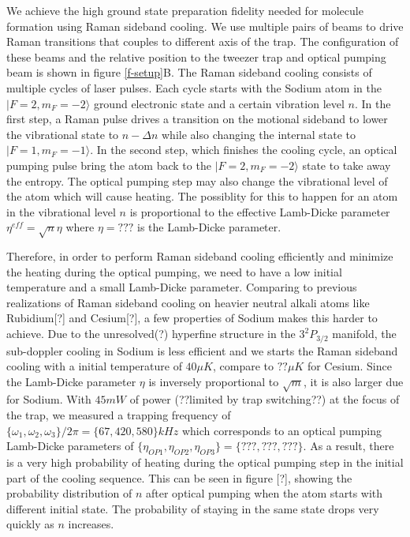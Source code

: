\documentclass[aps,twocolumn,secnumarabic,balancelastpage,amsmath,amssymb,nofootinbib]{revtex4}
\begin{document}
We achieve the high ground state preparation fidelity needed for molecule formation
using Raman sideband cooling. We use multiple pairs of beams to drive Raman transitions that
couples to different axis of the trap. The configuration of these beams and the relative position
to the tweezer trap and optical pumping beam is shown in figure \ref{f-setup}B.
The Raman sideband cooling consists of multiple cycles of laser pulses.
Each cycle starts with the Sodium atom in the $|F=2, m_F=-2\rangle$
ground electronic state and a certain vibration level $n$.
In the first step, a Raman pulse drives a transition on the motional sideband to lower
the vibrational state to $n-\Delta n$ while also changing the internal state
to $|F=1, m_F=-1\rangle$. In the second step, which finishes the cooling cycle,
an optical pumping pulse bring the atom back to the $|F=2, m_F=-2\rangle$ state to take away
the entropy. The optical pumping step may also change the vibrational level of the atom which
will cause heating. The possiblity for this to happen for an atom in the vibrational level $n$
is proportional to the effective Lamb-Dicke parameter $\eta^{eff}=\sqrt{n}\eta$ where $\eta=???$ is the Lamb-Dicke parameter.

Therefore, in order to perform Raman sideband cooling efficiently and minimize the heating during the optical pumping, we need to have a low initial temperature and a small Lamb-Dicke parameter. Comparing to previous realizations of Raman sideband cooling on heavier neutral alkali atoms like Rubidium[?] and Cesium[?], a few properties of Sodium makes this harder to achieve. Due to the unresolved(?) hyperfine structure in the $3^2P_{3/2}$ manifold, the sub-doppler cooling in Sodium is less efficient and we starts the Raman sideband cooling with a initial temperature of $40\mu K$, compare to $??\mu K$ for Cesium. Since the Lamb-Dicke parameter $\eta$ is inversely proportional to $\sqrt{m}$, it is also larger due for Sodium. With $45mW$ of power (??limited by trap switching??) at the focus of the trap, we measured a trapping frequency of $\{\omega_1,\omega_2,\omega_3\}/2\pi = \{67, 420, 580\} kHz$ which corresponds to an optical pumping Lamb-Dicke parameters of $\{\eta_{OP1},\eta_{OP2},\eta_{OP3}\} = \{???, ???, ???\}$. As a result, there is a very high probability of heating during the optical pumping step in the initial part of the cooling sequence.
This can be seen in figure [?], showing the probability distribution
of $n$ after optical pumping when the atom starts with different initial state. The probability
of staying in the same state drops very quickly as $n$ increases.
\end{document}
